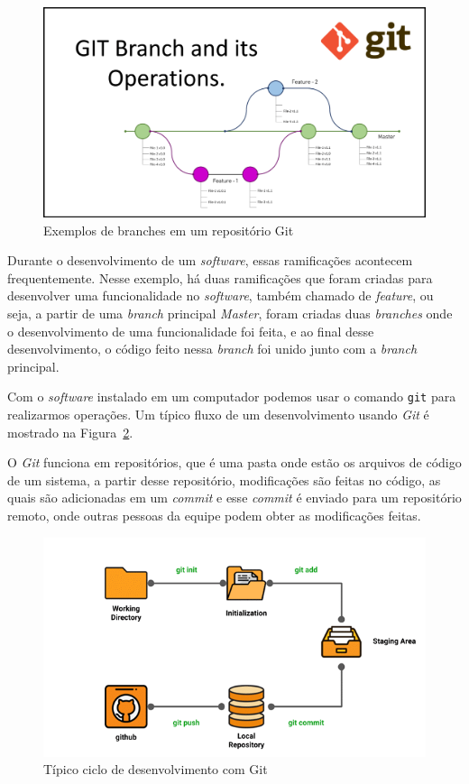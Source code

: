 \documentclass[12pt]{article}
\begin{document}
\begin{figure}[h]
  \centering
  \includegraphics[width=1\textwidth]{git/git-branches.png}
  \caption{Exemplos de branches em um repositório Git}\label{fig:git-branches}
\end{figure}

Durante o desenvolvimento de um \textit{software}, essas ramificações acontecem frequentemente. Nesse exemplo,
há duas ramificações que foram criadas para desenvolver uma funcionalidade no \textit{software}, também chamado de \textit{feature},
ou seja, a partir de uma \textit{branch} principal \textit{Master}, foram criadas duas \textit{branches} onde o desenvolvimento
de uma funcionalidade foi feita, e ao final desse desenvolvimento, o código feito nessa \textit{branch} foi
unido junto com a \textit{branch} principal.

Com o \textit{software} instalado em um computador podemos usar o comando \verb|git| para realizarmos operações.
Um típico fluxo de um desenvolvimento usando \textit{Git} é mostrado na Figura~\ref{fig:git-lifecycle}.

O \textit{Git} funciona em repositórios, que é uma pasta onde estão os arquivos de código de um sistema,
a partir desse repositório, modificações são feitas no código, as quais são adicionadas em um \textit{commit}
e esse \textit{commit} é enviado para um repositório remoto, onde outras pessoas da equipe podem obter as modificações feitas.

\begin{figure}[h]
  \centering
  \includegraphics[width=.8\textwidth]{git/git-lifecycle.png}
  \caption{Típico ciclo de desenvolvimento com Git}\label{fig:git-lifecycle}
\end{figure}
\end{document}
